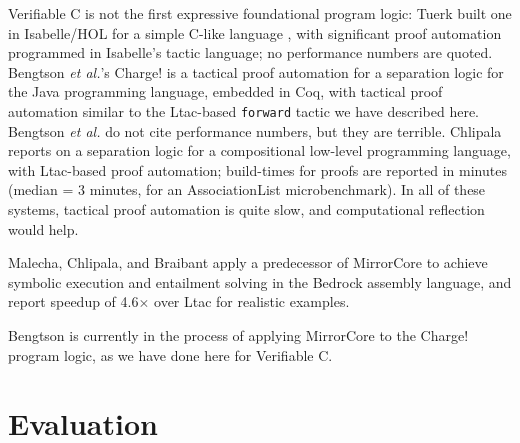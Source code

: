 \documentclass{puthesis}
\begin{document}
Verifiable C is not the first expressive foundational program logic:
Tuerk built one in Isabelle/HOL for a simple C-like language
\cite{Tuer09}, with significant proof automation programmed in
Isabelle's tactic language; no performance numbers are quoted.
Bengtson \emph{et al.}'s Charge! \cite{bengtson12:Charge} is a
tactical proof automation for a separation logic for the Java
programming language, embedded in Coq, with tactical proof automation
similar to the Ltac-based \lstinline{forward} tactic we have described
here.  Bengtson \emph{et al.} do not cite performance numbers, but
they are terrible.  Chlipala \cite{chlipala11:pldi} reports on a
separation logic for a compositional low-level programming language,
with Ltac-based proof automation; build-times for proofs are reported
in minutes (median = 3 minutes, for an AssociationList
microbenchmark).  In all of these systems, tactical proof automation
is quite slow, and computational reflection would help.

Malecha, Chlipala, and Braibant \cite{malecha2014compositional} apply a
predecessor of MirrorCore to achieve symbolic execution and entailment
solving in the Bedrock assembly language, and report speedup of
4.6$\times$ over Ltac for realistic examples. 

Bengtson is currently in the process of applying
MirrorCore to the Charge! program logic, as we have done here
for Verifiable C.

\chapter{Evaluation}
\label{ch:evaluation}
  
\end{document}
